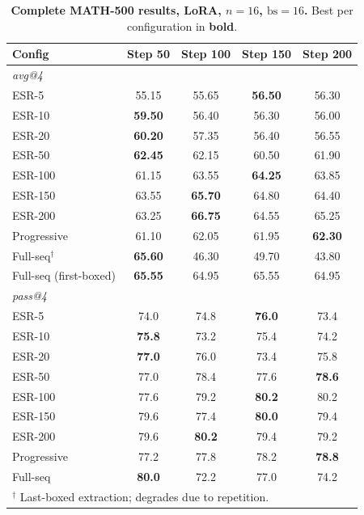 \documentclass{article}
\begin{document}
\begin{table}[!htbp]
\centering
\caption{\textbf{Complete MATH-500 results, LoRA, $n{=}16$, $\text{bs}{=}16$.} Best per configuration in \textbf{bold}.}
\label{tab:app_math_n16}
\footnotesize
\begin{tabular}{lcccc}
\toprule
\textbf{Config} & \textbf{Step 50} & \textbf{Step 100} & \textbf{Step 150} & \textbf{Step 200} \\
\midrule
\multicolumn{5}{l}{\textit{avg@4}} \\
\midrule
ESR-5 & 55.15 & 55.65 & \textbf{56.50} & 56.30 \\
ESR-10 & \textbf{59.50} & 56.40 & 56.30 & 56.00 \\
ESR-20 & \textbf{60.20} & 57.35 & 56.40 & 56.55 \\
ESR-50 & \textbf{62.45} & 62.15 & 60.50 & 61.90 \\
ESR-100 & 61.15 & 63.55 & \textbf{64.25} & 63.85 \\
ESR-150 & 63.55 & \textbf{65.70} & 64.80 & 64.40 \\
ESR-200 & 63.25 & \textbf{66.75} & 64.55 & 65.25 \\
Progressive & 61.10 & 62.05 & 61.95 & \textbf{62.30} \\
Full-seq$^\dagger$ & \textbf{65.60} & 46.30 & 49.70 & 43.80 \\
Full-seq (first-boxed) & \textbf{65.55} & 64.95 & 65.55 & 64.95 \\
\midrule
\multicolumn{5}{l}{\textit{pass@4}} \\
\midrule
ESR-5 & 74.0 & 74.8 & \textbf{76.0} & 73.4 \\
ESR-10 & \textbf{75.8} & 73.2 & 75.4 & 74.2 \\
ESR-20 & \textbf{77.0} & 76.0 & 73.4 & 75.8 \\
ESR-50 & 77.0 & 78.4 & 77.6 & \textbf{78.6} \\
ESR-100 & 77.6 & 79.2 & \textbf{80.2} & 80.2 \\
ESR-150 & 79.6 & 77.4 & \textbf{80.0} & 79.4 \\
ESR-200 & 79.6 & \textbf{80.2} & 79.4 & 79.2 \\
Progressive & 77.2 & 77.8 & 78.2 & \textbf{78.8} \\
Full-seq & \textbf{80.0} & 72.2 & 77.0 & 74.2 \\
\bottomrule
\multicolumn{5}{l}{\footnotesize $^\dagger$ Last-boxed extraction; degrades due to repetition.}
\end{tabular}
\end{table}
\end{document}
